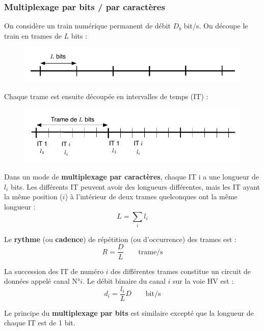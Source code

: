 \documentclass[11pt,english,french]{scrreprt}
\theoremstyle{remark}
\theoremstyle{definition}
\begin{document}
\subsubsection{Multiplexage par bits / par caractères} %

On considère un train numérique permanent de débit $D_b$ bit/s. On découpe le train en trames de $L$ bits : 
\begin{figure}[h!]
	\center
	\vspace{-25pt}
	\includegraphics[scale=.75]{graphes/train-trame}
	\vspace{-15pt}
\end{figure}

Chaque trame est ensuite découpée en intervalles de temps (IT) :
\begin{figure}[h!]
	\center
	\vspace{-15pt}
	\includegraphics[scale=.75]{graphes/intervalle-temps}
	\vspace{-15pt}
\end{figure}

Dans un mode de \textbf{multiplexage par caractères}, chaque IT i a une longueur de $l_i$ bits. Les différents IT peuvent avoir des longueurs différentes, mais les IT ayant la même position ($i$) à l'intérieur de deux trames quelconques ont la même longueur :
\[L=\sum_i l_i\]

Le \textbf{rythme} (ou \textbf{cadence}) de répétition (ou d'occurrence) des trames est : 
\[R=\frac{D}{L}\qquad\textrm{trame/s}\]

La succession des IT de numéro $i$ des différentes trames constitue un circuit de données appelé
canal N°$i$. Le débit binaire du canal $i$ sur la voie HV est : 
\[d_i=\frac{l_i}{L}D\qquad\textrm{bit/s}\]

Le principe du \textbf{multiplexage par bits} est similaire excepté que la longueur de chaque IT est de 1 bit.
\end{document}
